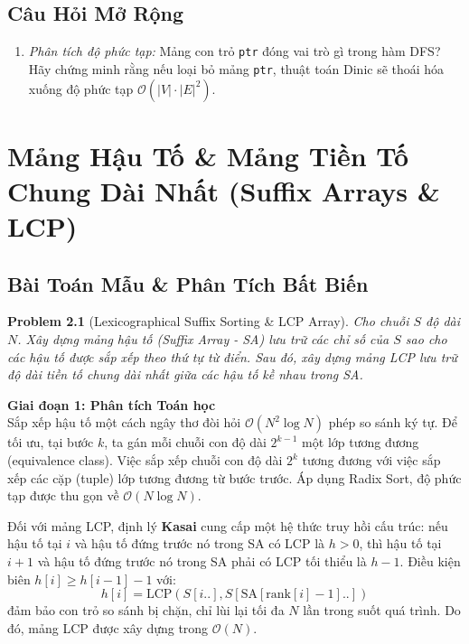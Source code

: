 \documentclass[11pt, letterpaper]{report}
\newtheorem{baitoan}{Problem}[chapter]
\begin{document}
\section{Câu Hỏi Mở Rộng}
\begin{enumerate}
 \item \textit{Phân tích độ phức tạp:} Mảng con trỏ \texttt{ptr} đóng vai trò gì trong hàm DFS? Hãy chứng minh rằng nếu loại bỏ mảng \texttt{ptr}, thuật toán Dinic sẽ thoái hóa xuống độ phức tạp $\mathcal{O}(|V| \cdot |E|^2)$.
\end{enumerate}

\chapter{Mảng Hậu Tố \& Mảng Tiền Tố Chung Dài Nhất (Suffix Arrays \& LCP)}
\label{mod:suffix_arrays}

\section{Bài Toán Mẫu \& Phân Tích Bất Biến}
\begin{baitoan}[Lexicographical Suffix Sorting \& LCP Array]
Cho chuỗi $S$ độ dài $N$. Xây dựng mảng hậu tố (Suffix Array - SA) lưu trữ các chỉ số của $S$ sao cho các hậu tố được sắp xếp theo thứ tự từ điển. Sau đó, xây dựng mảng LCP lưu trữ độ dài tiền tố chung dài nhất giữa các hậu tố kề nhau trong SA.
\end{baitoan}

\noindent\textbf{Giai đoạn 1: Phân tích Toán học}\\
Sắp xếp hậu tố một cách ngây thơ đòi hỏi $\mathcal{O}(N^2 \log N)$ phép so sánh ký tự. Để tối ưu, tại bước $k$, ta gán mỗi chuỗi con độ dài $2^{k-1}$ một lớp tương đương (equivalence class). Việc sắp xếp chuỗi con độ dài $2^k$ tương đương với việc sắp xếp các cặp (tuple) lớp tương đương từ bước trước. Áp dụng Radix Sort, độ phức tạp được thu gọn về $\mathcal{O}(N \log N)$.

Đối với mảng LCP, định lý \textbf{Kasai} cung cấp một hệ thức truy hồi cấu trúc: nếu hậu tố tại $i$ và hậu tố đứng trước nó trong SA có LCP là $h > 0$, thì hậu tố tại $i+1$ và hậu tố đứng trước nó trong SA phải có LCP tối thiểu là $h - 1$. Điều kiện biên $h[i] \ge h[i-1] - 1$ với:
\[
h[i] = \text{LCP}(S[i..], S[\text{SA}[\text{rank}[i]-1]..])
\]
đảm bảo con trỏ so sánh bị chặn, chỉ lùi lại tối đa $N$ lần trong suốt quá trình. Do đó, mảng LCP được xây dựng trong $\mathcal{O}(N)$.
\end{document}
